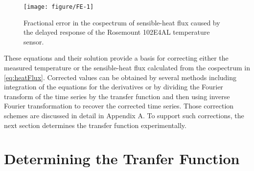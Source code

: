 \documentclass[11pt,twoside,american,12pt,twoside,american]{article}\usepackage[]{graphicx}\usepackage[]{color}
\makeatletter
\def\maxwidth{ %
  \ifdim\Gin@nat@width>\linewidth
    \linewidth
  \else
    \Gin@nat@width
  \fi
}
\newenvironment{knitrout}{}{} %
\let\stdsection\section
\renewcommand{\section}{\newpage\stdsection}
\makeatother
\begin{document}
\begin{knitrout}
\color{fgcolor}\begin{figure}

{\centering \texttt{[image: figure/FE-1]} 

}

\caption[Fractional error in the cospectrum of sensible-heat flux caused by the delayed response of the Rosemount 102E4AL temperature sensor]{Fractional error in the cospectrum of sensible-heat flux caused by the delayed response of the Rosemount 102E4AL temperature sensor.}\label{fig:FE}
\end{figure}


\end{knitrout}

These equations and their solution provide a basis for correcting
either the measured temperature or the sensible-heat flux calculated
from the cospectrum in \eqref{eq:heatFlux}. Corrected values can
be obtained by several methods including integration of the equations
for the derivatives or by dividing the Fourier transform of the time
series by the transfer function and then using inverse Fourier transformation
to recover the corrected time series. Those correction schemes are
discussed in detail in Appendix A. To support such corrections, the
next section determines the transfer function experimentally. 

\section{Determining the Tranfer Function}
\end{document}
